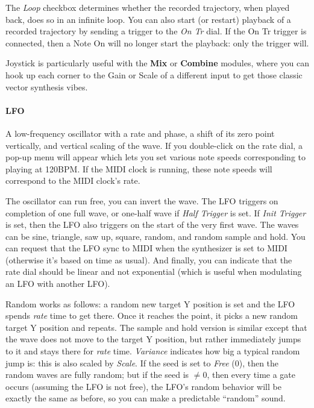 \documentclass{article}
\begin{document}
The {\it Loop} checkbox determines whether the recorded trajectory, when played back, does so in an infinite loop. You can also start (or restart) playback of a recorded trajectory by sending a trigger to the {\it On Tr} dial. If the On Tr trigger is connected, then a Note On will no longer start the playback: only the trigger will. 

Joystick is particularly useful with the {\bf Mix} or {\bf Combine} modules, where you can hook up each corner to the Gain or Scale of a different input to get those classic vector synthesis vibes.  
  
\paragraph{LFO}  A low-frequency oscillator with a rate and phase, a shift of its zero point vertically, and vertical scaling of the wave.   If you double-click on the rate dial, a pop-up menu will appear which lets you set various note speeds corresponding to playing at 120BPM.  If the MIDI clock is running, these note speeds will correspond to the MIDI clock's rate.

The oscillator can run free, you can invert the wave.    The LFO triggers on completion of one full wave, or one-half wave if {\it Half Trigger} is set.  If {\it Init Trigger} is set, then the LFO also triggers on the start of the very first wave.  The waves can be sine, triangle, saw up, square, random, and random sample and hold.   You can request that the LFO sync to MIDI when the synthesizer is set to MIDI (otherwise it's based on time as usual).  And finally, you can indicate that the rate dial should be linear and not exponential (which is useful when modulating an LFO with another LFO).

Random works as follows: a random new target Y position is set and the LFO spends {\it rate} time to get there.  Once it reaches the point, it picks a new random target Y position and repeats.  The sample and hold version is similar except that the wave does not move to the target Y position, but rather immediately jumps to it and stays there for {\it rate} time.   {\it Variance} indicates how big a typical random jump is: this is also scaled by {\it Scale}.  If the seed is set to {\it Free} (0), then the random waves are fully random; but if the seed is \(\neq 0\), then every time a gate occurs (assuming the LFO is not free), the LFO's random behavior will be exactly the same as before, so you can make a predictable ``random'' sound.
\end{document}

